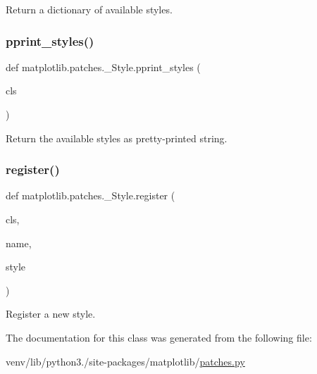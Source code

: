 \begin{DoxyVerb}Return a dictionary of available styles.\end{DoxyVerb}
 \mbox{\label{classmatplotlib_1_1patches_1_1__Style_a2cc1b8a10325b24507d3ecd8c37a3078}} 
\subsubsection{\texorpdfstring{pprint\+\_\+styles()}{pprint\_styles()}}
{\footnotesize\ttfamily def matplotlib.\+patches.\+\_\+\+Style.\+pprint\+\_\+styles (\begin{DoxyParamCaption}\item[{}]{cls }\end{DoxyParamCaption})}

\begin{DoxyVerb}Return the available styles as pretty-printed string.\end{DoxyVerb}
 \mbox{\label{classmatplotlib_1_1patches_1_1__Style_aa9d160563b11182297334dad8fb85329}} 
\subsubsection{\texorpdfstring{register()}{register()}}
{\footnotesize\ttfamily def matplotlib.\+patches.\+\_\+\+Style.\+register (\begin{DoxyParamCaption}\item[{}]{cls,  }\item[{}]{name,  }\item[{}]{style }\end{DoxyParamCaption})}

\begin{DoxyVerb}Register a new style.\end{DoxyVerb}
 

The documentation for this class was generated from the following file\+:\begin{DoxyCompactItemize}
\item 
venv/lib/python3./site-\/packages/matplotlib/\hyperlink{patches_8py}{patches.\+py}\end{DoxyCompactItemize}
